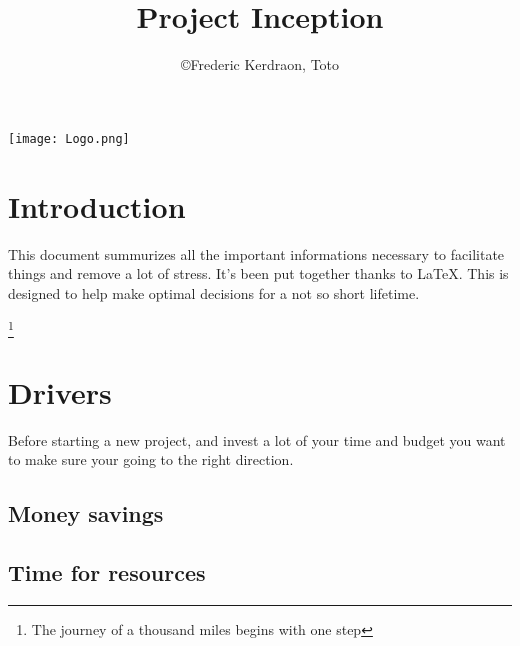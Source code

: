 \documentclass[8pt]{article} %
\title{Project Inception}
\author{\copyright Frederic Kerdraon, Toto}
\begin{document}
\maketitle
\hspace*{-1cm}\texttt{[image: Logo.png]}
\tableofcontents

\section{Introduction}

This document summurizes all the important informations necessary to facilitate things and remove a lot of stress. It's been put together thanks to \LaTeX. This is designed to help make optimal decisions for a not so short lifetime.

\footnote{The journey of a thousand miles begins with one step}
%


\newcommand{\slice}[4]{
  \pgfmathparse{0.5*#1+0.5*#2}
  \let\midangle\pgfmathresult

   slice
  \draw[thick,fill=black!10] (0,0) -- (#1:1) arc (#1:#2:1) -- cycle;

   outer label
  \node[label=\midangle:#4] at (\midangle:1) {};

   inner label
  \pgfmathparse{min((#2-#1-10)/110*(-0.3),0)}
  \let\temp\pgfmathresult
  \pgfmathparse{max(\temp,-0.5) + 0.8}
  \let\innerpos\pgfmathresult
  \node at (\midangle:\innerpos) {#3};
}

\section{Drivers}
Before starting a new project, and invest a lot of your time and budget you want to make sure your going to the right direction. 
\subsection{Money savings}
\subsection{Time for resources}
\end{document}
